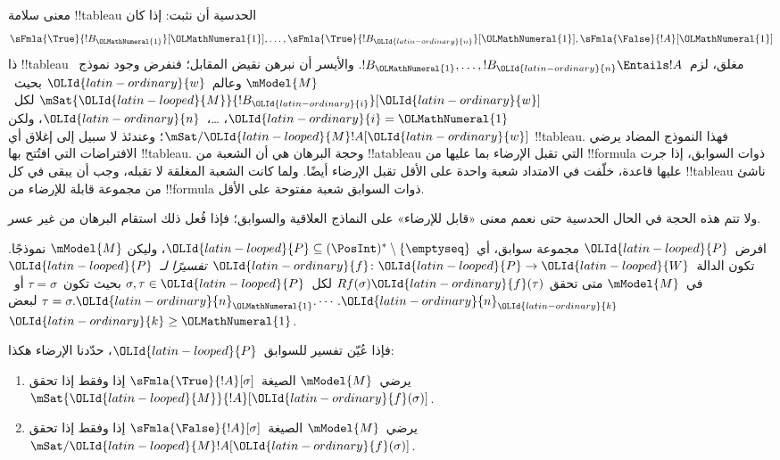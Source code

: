 \documentclass[../../../include/open-logic-section]{subfiles}
\begin{document}


\begin{explain}
  معنى سلامة !!{tableau} الحدسية أن نثبت: إذا كان
  \[
  \sFmla{\True}{!B_\OLMathNumeral{1}}[\OLMathNumeral{1}], \dots, \sFmla{\True}{!B_\OLId{latin-ordinary}{n}}[\OLMathNumeral{1}], \sFmla{\False}{!A}[\OLMathNumeral{1}]
  \]
  ذا !!{tableau} مغلق، لزم~$!B_\OLMathNumeral{1}, \dots, !B_\OLId{latin-ordinary}{n} \Entails !A$.
  والأيسر أن نبرهن نقيض المقابل؛ فنفرض وجود نموذج~$\mModel{M}$ وعالم~$\OLId{latin-ordinary}{w}$
  بحيث~$\mSat{\OLId{latin-looped}{M}}{!B_\OLId{latin-ordinary}{i}}[\OLId{latin-ordinary}{w}]$ لكل~$\OLId{latin-ordinary}{i}=\OLMathNumeral{1}$، \dots،~$\OLId{latin-ordinary}{n}$، ولكن
  $\mSat/{\OLId{latin-looped}{M}}{!A}[\OLId{latin-ordinary}{w}]$؛ وعندئذ لا سبيل إلى إغلاق أي !!{tableau}. فهذا
  النموذج المضاد يرضي الافتراضات التي افتُتح بها !!{tableau}. وحجة
  البرهان هي أن الشعبة من !!a{tableau} التي تقبل الإرضاء بما عليها من !!{formula} ذوات
  السوابق، إذا جرت عليها قاعدة، خلّفت في الامتداد شعبة واحدة على الأقل
  تقبل الإرضاء أيضًا. ولما كانت الشعبة المغلقة لا تقبله، وجب أن يبقى في
  كل !!{tableau} ناشئ من مجموعة قابلة للإرضاء من !!{formula} ذوات
  السوابق شعبة مفتوحة على الأقل.

  ولا تتم هذه الحجة في الحال الحدسية حتى نعمم معنى «قابل للإرضاء» على
  النماذج العلاقية والسوابق؛ فإذا فُعل ذلك استقام البرهان من غير عسر.
\end{explain}

\begin{defn}
  افرض~$\OLId{latin-looped}{P}$ مجموعة سوابق، أي
  $\OLId{latin-looped}{P} \subseteq (\PosInt)^* \setminus \{\emptyseq\}$، وليكن
  $\mModel{M}$ نموذجًا. تكون الدالة~$\OLId{latin-ordinary}{f}\colon \OLId{latin-looped}{P} \to \OLId{latin-looped}{W}$
  \emph{تفسيرًا لـ}~$\OLId{latin-looped}{P}$ في~$\mModel{M}$ متى تحقق
  $Rf(\sigma)\OLId{latin-ordinary}{f}(\tau)$ لكل~$\sigma,\tau\in \OLId{latin-looped}{P}$ بحيث تكون~$\tau=\sigma$
  أو~$\tau=\sigma.\OLId{latin-ordinary}{n}_\OLMathNumeral{1}.\cdots.\OLId{latin-ordinary}{n}_\OLId{latin-ordinary}{k}$ لبعض~$\OLId{latin-ordinary}{k}\geq \OLMathNumeral{1}$.

  فإذا عُيّن تفسير للسوابق~$\OLId{latin-looped}{P}$، حدّدنا الإرضاء هكذا:
  \begin{enumerate}
  \item يرضي~$\mModel{M}$ الصيغة~$\sFmla{\True}{!A}[\sigma]$ إذا وفقط
    إذا تحقق~$\mSat{\OLId{latin-looped}{M}}{!A}[\OLId{latin-ordinary}{f}(\sigma)]$.
  \item يرضي~$\mModel{M}$ الصيغة~$\sFmla{\False}{!A}[\sigma]$ إذا وفقط
    إذا تحقق~$\mSat/{\OLId{latin-looped}{M}}{!A}[\OLId{latin-ordinary}{f}(\sigma)]$.
  \end{enumerate}
\end{defn}
\end{document}
